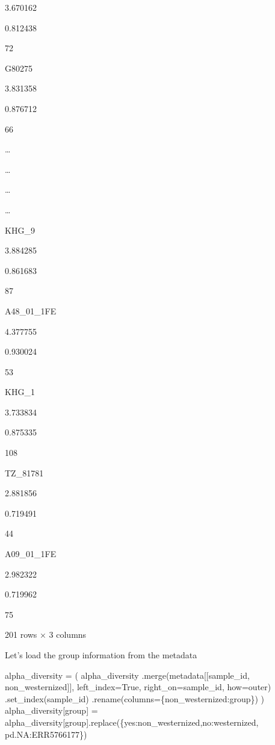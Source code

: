 \documentclass[
  letterpaper,
]{book}
\newenvironment{Shaded}{}{}
\newcommand{\NormalTok}[1]{\textcolor[rgb]{0.14,0.16,0.18}{#1}}
\newcommand{\OperatorTok}[1]{\textcolor[rgb]{0.14,0.16,0.18}{#1}}
\newcommand{\StringTok}[1]{\textcolor[rgb]{0.01,0.18,0.38}{#1}}
\newcommand{\VariableTok}[1]{\textcolor[rgb]{0.89,0.38,0.04}{#1}}
\begin{document}
3.670162

0.812438

72

G80275

3.831358

0.876712

66

\ldots{}

\ldots{}

\ldots{}

\ldots{}

KHG\_9

3.884285

0.861683

87

A48\_01\_1FE

4.377755

0.930024

53

KHG\_1

3.733834

0.875335

108

TZ\_81781

2.881856

0.719491

44

A09\_01\_1FE

2.982322

0.719962

75

201 rows × 3 columns

Let's load the group information from the metadata

\begin{Shaded}
\begin{Highlighting}[]
\NormalTok{alpha\_diversity }\OperatorTok{=}\NormalTok{ (}
\NormalTok{    alpha\_diversity}
\NormalTok{    .merge(metadata[[}\StringTok{\textquotesingle{}sample\_id\textquotesingle{}}\NormalTok{, }\StringTok{\textquotesingle{}non\_westernized\textquotesingle{}}\NormalTok{]], left\_index}\OperatorTok{=}\VariableTok{True}\NormalTok{, right\_on}\OperatorTok{=}\StringTok{\textquotesingle{}sample\_id\textquotesingle{}}\NormalTok{, how}\OperatorTok{=}\StringTok{\textquotesingle{}outer\textquotesingle{}}\NormalTok{)}
\NormalTok{    .set\_index(}\StringTok{\textquotesingle{}sample\_id\textquotesingle{}}\NormalTok{)}
\NormalTok{    .rename(columns}\OperatorTok{=}\NormalTok{\{}\StringTok{\textquotesingle{}non\_westernized\textquotesingle{}}\NormalTok{:}\StringTok{\textquotesingle{}group\textquotesingle{}}\NormalTok{\})}
\NormalTok{)}
\NormalTok{alpha\_diversity[}\StringTok{\textquotesingle{}group\textquotesingle{}}\NormalTok{] }\OperatorTok{=}\NormalTok{ alpha\_diversity[}\StringTok{\textquotesingle{}group\textquotesingle{}}\NormalTok{].replace(\{}\StringTok{\textquotesingle{}yes\textquotesingle{}}\NormalTok{:}\StringTok{\textquotesingle{}non\_westernized\textquotesingle{}}\NormalTok{,}\StringTok{\textquotesingle{}no\textquotesingle{}}\NormalTok{:}\StringTok{\textquotesingle{}westernized\textquotesingle{}}\NormalTok{, pd.NA:}\StringTok{\textquotesingle{}ERR5766177\textquotesingle{}}\NormalTok{\})}
\end{Highlighting}
\end{Shaded}
\end{document}
